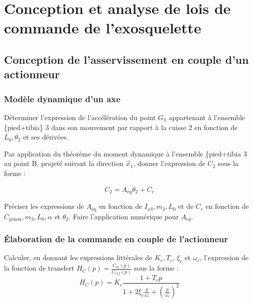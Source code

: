 \documentclass[11pt]{article}
\begin{document}
\section{Conception et analyse de lois de commande de l’exosquelette}
\subsection{Conception de l'asservissement en couple d'un actionneur}

\subsubsection{Modèle dynamique d'un axe}

\UPSTIquestion Déterminer l'expression de l'accélération du point $G_{3}$ appartenant à l'ensemble \{pied+tibia\} 3 dans son mouvement par rapport à la cuisse 2 en fonction de $L_{0}, \theta_{2}$ et ses dérivées.
\begin{UPSTIcorrige}

\end{UPSTIcorrige}

\UPSTIquestion Par application du théorème du moment dynamique à l'ensemble \{pied+tibia 3 au point B, projeté suivant la direction $\vec{x}_{1}$, donner l'expression de $C_{2}$ sous la forme :

$$
C_{2}=A_{\mathrm{eq}} \ddot{\theta}_{2}+C_{r}
$$

Préciser les expressions de $A_{\textrm{eq}}$ en fonction de $I_{x 3}, m_{3}, L_{0}$ et de $C_{r}$ en fonction de $C_{\textrm{genou}}, m_{3}, L_{0}, \alpha$ et $\theta_{2}$. Faire l'application numérique pour $A_{e q}$.
\begin{UPSTIcorrige}

\end{UPSTIcorrige}


\subsubsection{Élaboration de la commande en couple de l'actionneur}

\UPSTIquestion  Calculer, en donnant les expressions littérales de $K_{c}, T_{c}$, $\xi_{c}$ et $\omega_{c}$, l'expression de la fonction de transfert $H_{C}(p)=\frac{C_{m}(p)}{C_{r e f}(p)}$ sous la forme :
$$
H_{C}(p)=K_{c} \frac{1+T_{c} p}{1+2 \xi_{c} \frac{p}{\omega_{c}}+\left(\frac{p}{\omega_{c}}\right)^{2}}
$$
\begin{UPSTIcorrige}

\end{UPSTIcorrige}
\end{document}
